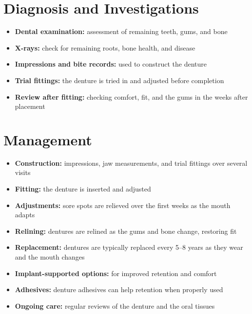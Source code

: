 \section*{Diagnosis and Investigations}
\begin{itemize}
    \item \textbf{Dental examination:} assessment of remaining teeth, gums, and bone
    \item \textbf{X-rays:} check for remaining roots, bone health, and disease
    \item \textbf{Impressions and bite records:} used to construct the denture
    \item \textbf{Trial fittings:} the denture is tried in and adjusted before completion
    \item \textbf{Review after fitting:} checking comfort, fit, and the gums in the weeks after placement
\end{itemize}

\section*{Management}
\begin{itemize}
    \item \textbf{Construction:} impressions, jaw measurements, and trial fittings over several visits
    \item \textbf{Fitting:} the denture is inserted and adjusted
    \item \textbf{Adjustments:} sore spots are relieved over the first weeks as the mouth adapts
    \item \textbf{Relining:} dentures are relined as the gums and bone change, restoring fit
    \item \textbf{Replacement:} dentures are typically replaced every 5--8 years as they wear and the mouth changes
    \item \textbf{Implant-supported options:} for improved retention and comfort
    \item \textbf{Adhesives:} denture adhesives can help retention when properly used
    \item \textbf{Ongoing care:} regular reviews of the denture and the oral tissues
\end{itemize}

